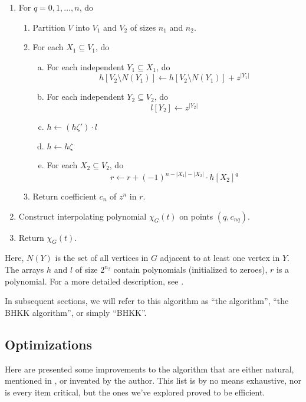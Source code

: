 \documentclass{cslthse-msc}
\begin{document}
\begin{enumerate}[{Step} A.]
\item \label{q} For $q = 0, 1, \ldots, n$, do
\begin{enumerate}[1.]
  \item Partition $V$ into $V_1$ and $V_2$ of sizes $n_1$ and $n_2$.
  \item \label{step1} For each $X_1 \subseteq V_1$, do
  \begin{enumerate}[a)]
  \item \label{indep1} For each independent $Y_1 \subseteq X_1$, do
\[ h[V_2 \setminus N(Y_1)] \leftarrow h[V_2 \setminus N(Y_1)] + z^{|Y_1|} \]
  \item \label{indep2} For each independent $Y_2 \subseteq V_2$, do
\[ l[Y_2] \leftarrow z^{|Y_2|} \]
  \item \label{multi} $h \leftarrow (h\zeta')\cdot l$
  \item $h \leftarrow h\zeta$
  \item \label{rstep}For each $X_2 \subseteq V_2$, do
\[ r \leftarrow r + (-1)^{n - |X_1| - |X_2|}\cdot h[X_2]^q \]
  \end{enumerate}
  \item Return coefficient $c_n$ of $z^n$ in $r$.
\end{enumerate}
\item Construct interpolating polynomial $\chi_G(t)$ on points $(q, c_{nq})$.
\item Return $\chi_G(t)$.
\end{enumerate}
Here, $N(Y)$ is the set of all vertices in $G$ adjacent to at least one vertex in $Y$. The arrays $h$ and $l$ of size $2^{n_2}$ contain polynomials (initialized to zeroes), $r$ is a polynomial. For a more detailed description, see \cite[p 9]{cov_pack}.

In subsequent sections, we will refer to this algorithm as ``the algorithm'', ``the BHKK algorithm'', or simply ``BHKK''.

\subsection{Optimizations}\label{optimizations}
Here are presented some improvements to the algorithm that are either natural, mentioned in \cite{cov_pack}, or invented by the author. This list is by no means exhaustive, nor is every item critical, but the ones we've explored proved to be efficient. 
\end{document}
